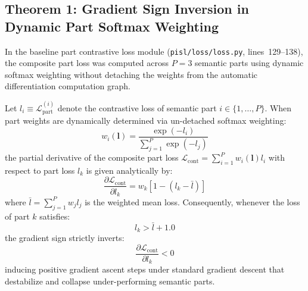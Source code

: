 \subsection{Theorem 1: Gradient Sign Inversion in Dynamic Part Softmax Weighting}
\label{subsec:thm1}

In the baseline part contrastive loss module (\texttt{pisl/loss/loss.py}, lines~129--138), the composite part loss was computed across $P=3$ semantic parts using dynamic softmax weighting without detaching the weights from the automatic differentiation computation graph.

\begin{theorem}
\label{thm:grad_inversion}
\label{thm:part_gradient_inversion}
Let $l_i \equiv \mathcal{L}_{\text{part}}^{(i)}$ denote the contrastive loss of semantic part $i \in \{1, \dots, P\}$. When part weights are dynamically determined via un-detached softmax weighting:
\begin{equation}
    w_i(\mathbf{l}) = \frac{\exp(-l_i)}{\sum_{j=1}^P \exp(-l_j)}
\end{equation}
the partial derivative of the composite part loss $\mathcal{L}_{\text{cont}} = \sum_{i=1}^P w_i(\mathbf{l}) l_i$ with respect to part loss $l_k$ is given analytically by:
\begin{equation}
    \frac{\partial \mathcal{L}_{\text{cont}}}{\partial l_k} = w_k \left[ 1 - (l_k - \bar{l}) \right]
\end{equation}
where $\bar{l} = \sum_{j=1}^P w_j l_j$ is the weighted mean loss. Consequently, whenever the loss of part $k$ satisfies:
\begin{equation}
    l_k > \bar{l} + 1.0
\end{equation}
the gradient sign strictly inverts:
\begin{equation}
    \frac{\partial \mathcal{L}_{\text{cont}}}{\partial l_k} < 0
\end{equation}
inducing positive gradient ascent steps under standard gradient descent that destabilize and collapse under-performing semantic parts.
\end{theorem}


